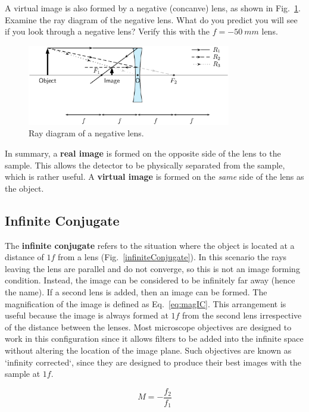 \documentclass[a4paper]{report}
\begin{document}
A virtual image is also formed by a negative (concanve) lens, as shown in Fig.~\ref{fig:neglens}. 
Examine the ray diagram of the negative lens. 
What do you predict you will see if you look through a negative lens?
Verify this with the $f=-50~mm$ lens.
\begin{figure}[h]
\center
\includegraphics[width=3.5in]{negative_lens.eps}
\caption{Ray diagram of a negative lens.}
\label{fig:neglens}
\end{figure}

In summary, a \textbf{real image} is formed on the opposite side of the lens to the sample. 
This allows the detector to be physically separated from the sample, which is rather useful.
A \textbf{virtual image} is formed on the \textit{same} side of the lens as the object. 

\clearpage

\subsection{Infinite Conjugate}
The \textbf{infinite conjugate} refers to the situation where the object is located at a distance of $1f$ from a lens (Fig.~\ref{infiniteConjugate}). 
In this scenario the rays leaving the lens are parallel and do not converge, so this is not an image forming condition. 
Instead, the image can be considered to be infinitely far away (hence the name). 
If a second lens is added, then an image can be formed. 
The magnification of the image is defined as Eq.~\ref{eq:magIC}. 
This arrangement is useful because the image is always formed at $1f$ from the second lens irrespective of the distance between the lenses.
Most microscope objectives are designed to work in this configuration since it allows filters to be added into the infinite space without altering the location of the image plane. 
Such objectives are known as `infinity corrected`, since they are designed to produce their best images with the sample at $1f$.

\begin{equation}
M=-\frac{f_2}{f_1}
\label{eq:magIC}
\end{equation}
\end{document}
